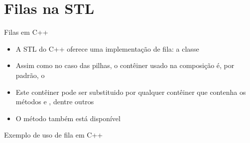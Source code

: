 \section{Filas na STL}

\begin{frame}[fragile]{Filas em C++}

    \begin{itemize}
        \item A STL do C++ oferece uma implementação de fila: a classe 

        \item Assim como no caso das pilhas, o contêiner usado na composição é, por padrão,
            o 

        \item Este contêiner pode ser substituido por qualquer contêiner que contenha os métodos
             e , dentre outros

        \item O método  também está disponível
    \end{itemize}

\end{frame}

\begin{frame}[fragile]{Exemplo de uso de fila em C++}
\end{frame}

